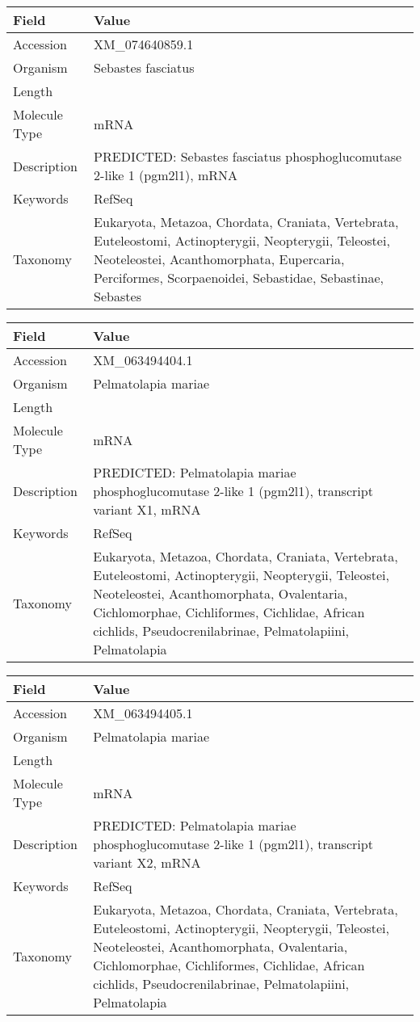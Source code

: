 \documentclass[10pt]{article}
\begin{document}
{\footnotesize
\begin{longtable}{>{\raggedright\arraybackslash}p{4.5cm} >{\raggedright\arraybackslash}p{11.5cm}}
\textbf{Field} & \textbf{Value} \\
\hline
Accession & XM\_074640859.1 \\
Organism & Sebastes fasciatus \\
Length & 2725 \\
Molecule Type & mRNA \\
Description & PREDICTED: Sebastes fasciatus phosphoglucomutase 2-like 1 (pgm2l1), mRNA \\
Keywords & RefSeq \\
Taxonomy & Eukaryota, Metazoa, Chordata, Craniata, Vertebrata, Euteleostomi, Actinopterygii, Neopterygii, Teleostei, Neoteleostei, Acanthomorphata, Eupercaria, Perciformes, Scorpaenoidei, Sebastidae, Sebastinae, Sebastes \\
\end{longtable}
}

{\footnotesize
\begin{longtable}{>{\raggedright\arraybackslash}p{4.5cm} >{\raggedright\arraybackslash}p{11.5cm}}
\textbf{Field} & \textbf{Value} \\
\hline
Accession & XM\_063494404.1 \\
Organism & Pelmatolapia mariae \\
Length & 3078 \\
Molecule Type & mRNA \\
Description & PREDICTED: Pelmatolapia mariae phosphoglucomutase 2-like 1 (pgm2l1), transcript variant X1, mRNA \\
Keywords & RefSeq \\
Taxonomy & Eukaryota, Metazoa, Chordata, Craniata, Vertebrata, Euteleostomi, Actinopterygii, Neopterygii, Teleostei, Neoteleostei, Acanthomorphata, Ovalentaria, Cichlomorphae, Cichliformes, Cichlidae, African cichlids, Pseudocrenilabrinae, Pelmatolapiini, Pelmatolapia \\
\end{longtable}
}

{\footnotesize
\begin{longtable}{>{\raggedright\arraybackslash}p{4.5cm} >{\raggedright\arraybackslash}p{11.5cm}}
\textbf{Field} & \textbf{Value} \\
\hline
Accession & XM\_063494405.1 \\
Organism & Pelmatolapia mariae \\
Length & 2833 \\
Molecule Type & mRNA \\
Description & PREDICTED: Pelmatolapia mariae phosphoglucomutase 2-like 1 (pgm2l1), transcript variant X2, mRNA \\
Keywords & RefSeq \\
Taxonomy & Eukaryota, Metazoa, Chordata, Craniata, Vertebrata, Euteleostomi, Actinopterygii, Neopterygii, Teleostei, Neoteleostei, Acanthomorphata, Ovalentaria, Cichlomorphae, Cichliformes, Cichlidae, African cichlids, Pseudocrenilabrinae, Pelmatolapiini, Pelmatolapia \\
\end{longtable}
}
\end{document}

